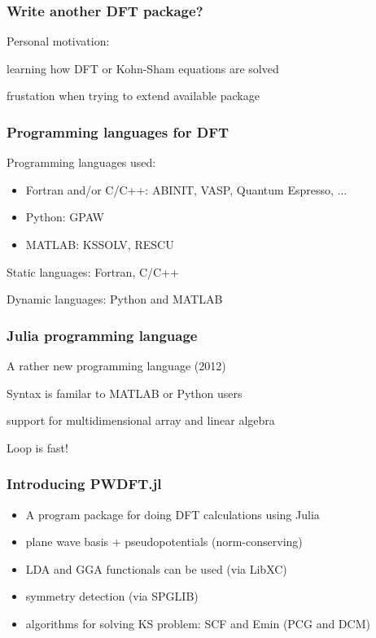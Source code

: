 \documentclass[english,9pt]{beamer}
\begin{document}
\begin{frame}
\frametitle{Write another DFT package?}

Personal motivation:

learning how DFT or Kohn-Sham equations are solved

frustation when trying to extend available package

\end{frame}



\begin{frame}
\frametitle{Programming languages for DFT}
    
Programming languages used:
\begin{itemize}
\item Fortran and/or C/C++: ABINIT, VASP, Quantum Espresso, ...
\item Python: GPAW
\item MATLAB: KSSOLV, RESCU
\end{itemize}
    
Static languages: Fortran, C/C++

Dynamic languages: Python and MATLAB

\end{frame}



\begin{frame}
\frametitle{Julia programming language}

A rather new programming language (2012)

Syntax is familar to MATLAB or Python users

support for multidimensional array and linear algebra

Loop is fast!

\end{frame}



\begin{frame}
\frametitle{Introducing PWDFT.jl}

\begin{itemize}
\item A program package for doing DFT calculations using Julia
\item plane wave basis + pseudopotentials (norm-conserving)
\item LDA and GGA functionals can be used (via LibXC)
\item symmetry detection (via SPGLIB)
\item algorithms for solving KS problem: SCF and Emin (PCG and DCM)
\end{itemize}

\end{frame}
\end{document}
